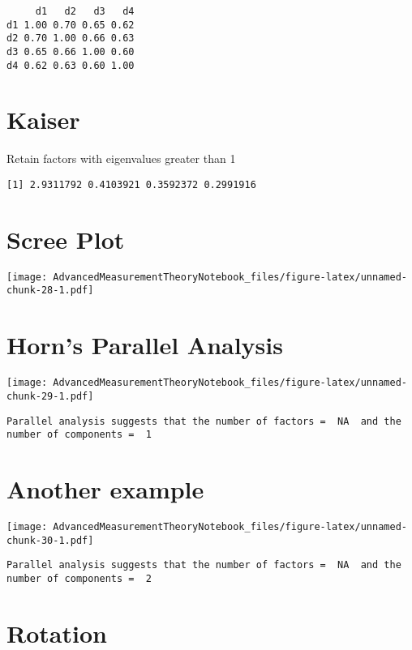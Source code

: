 \documentclass[
]{book}
\begin{document}
\begin{verbatim}
     d1   d2   d3   d4
d1 1.00 0.70 0.65 0.62
d2 0.70 1.00 0.66 0.63
d3 0.65 0.66 1.00 0.60
d4 0.62 0.63 0.60 1.00
\end{verbatim}

\hypertarget{kaiser}{%
\section{Kaiser}\label{kaiser}}

Retain factors with eigenvalues greater than 1

\begin{verbatim}
[1] 2.9311792 0.4103921 0.3592372 0.2991916
\end{verbatim}

\hypertarget{scree-plot}{%
\section{Scree Plot}\label{scree-plot}}

\texttt{[image: AdvancedMeasurementTheoryNotebook\_files/figure-latex/unnamed-chunk-28-1.pdf]}

\hypertarget{horns-parallel-analysis}{%
\section{Horn's Parallel Analysis}\label{horns-parallel-analysis}}

\texttt{[image: AdvancedMeasurementTheoryNotebook\_files/figure-latex/unnamed-chunk-29-1.pdf]}

\begin{verbatim}
Parallel analysis suggests that the number of factors =  NA  and the number of components =  1 
\end{verbatim}

\hypertarget{another-example}{%
\section{Another example}\label{another-example}}

\texttt{[image: AdvancedMeasurementTheoryNotebook\_files/figure-latex/unnamed-chunk-30-1.pdf]}

\begin{verbatim}
Parallel analysis suggests that the number of factors =  NA  and the number of components =  2 
\end{verbatim}

\hypertarget{rotation}{%
\section{Rotation}\label{rotation}}
\end{document}
